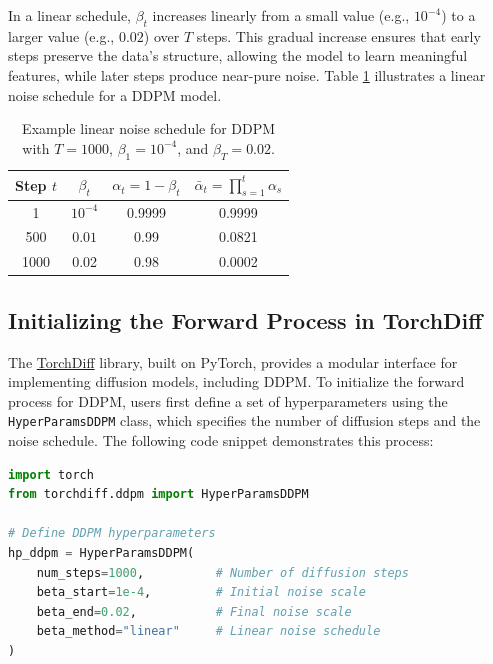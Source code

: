 \documentclass[12pt]{article}
\begin{document}
In a linear schedule, \( \beta_t \) increases linearly from a small value (e.g., \( 10^{-4} \)) to a larger value (e.g., \( 0.02 \)) over \( T \) steps. This gradual increase ensures that early steps preserve the data’s structure, allowing the model to learn meaningful features, while later steps produce near-pure noise. Table \ref{tab:beta_schedule} illustrates a linear noise schedule for a DDPM model.

\begin{table}[htbp]
    \centering
    \caption{Example linear noise schedule for DDPM with \( T = 1000 \), \( \beta_1 = 10^{-4} \), and \( \beta_T = 0.02 \).}
    \label{tab:beta_schedule}
    \begin{tabular}{c|c|c|c}
        \hline
        Step \( t \) & \( \beta_t \) & \( \alpha_t = 1 - \beta_t \) & \( \bar{\alpha}_t = \prod_{s=1}^{t} \alpha_s \) \\
        \hline
        1 & \( 10^{-4} \) & 0.9999 & 0.9999 \\
        500 & \( 0.01 \) & 0.99 & 0.0821 \\
        1000 & 0.02 & 0.98 & 0.0002 \\
        \hline
    \end{tabular}
\end{table}

\subsection{Initializing the Forward Process in TorchDiff}
\label{subsec:torchdiff_forward}

The \href{https://torchdiff.readthedocs.io}{TorchDiff} library, built on PyTorch, provides a modular interface for implementing diffusion models, including DDPM. To initialize the forward process for DDPM, users first define a set of hyperparameters using the \texttt{HyperParamsDDPM} class, which specifies the number of diffusion steps and the noise schedule. The following code snippet demonstrates this process:

\begin{lstlisting}[language=Python, caption={Initializing DDPM hyperparameters in TorchDiff.}, label={lst:hyperparams}]
import torch
from torchdiff.ddpm import HyperParamsDDPM

# Define DDPM hyperparameters
hp_ddpm = HyperParamsDDPM(
    num_steps=1000,          # Number of diffusion steps
    beta_start=1e-4,         # Initial noise scale
    beta_end=0.02,           # Final noise scale
    beta_method="linear"     # Linear noise schedule
)
\end{lstlisting}
\end{document}

